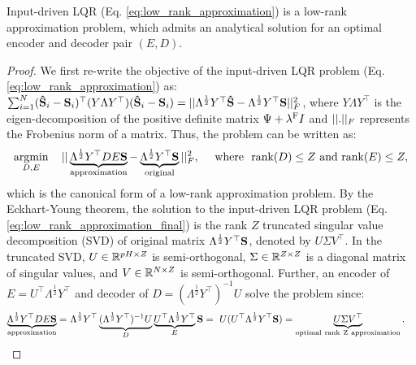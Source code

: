 \begin{prop}
    Input-driven LQR (Eq. \ref{eq:low_rank_approximation}) is a low-rank approximation problem, which admits an analytical solution for an optimal encoder and decoder pair $(E, D)$. \label{prop:input_dirven_lqr}
\end{prop}
\begin{proof}
    \renewcommand{\qedsymbol}{}
We first re-write the objective of the input-driven LQR problem (Eq. \ref{eq:low_rank_approximation}) as: 
$\sum_{i=1}^{N}(\bold{\hat{S}}_i - \bold{S}_i)^\top (Y \Lambda Y^\top) (\bold{\hat{S}}_i - \bold{S}_i)
= \vert\vert \Lambda^{\frac{1}{2}} Y^\top \bold{\hat{S}} - \Lambda^{\frac{1}{2}}Y^\top \bold{S} \vert\vert_F^2$, 
where $Y \Lambda Y^\top$ is the eigen-decomposition of the positive definite matrix $\Psi + \lambda^{\mathrm{F}} I$ and $\vert\vert . \vert\vert_F$ represents the Frobenius norm of a matrix. Thus, the problem can be written as: 
    \begin{align}
        \mathop{\rm argmin}_{D,E} \quad \vert\vert \underbrace{\Lambda^{\frac{1}{2}}Y^\top DE \bold{S}}_{\mathrm{approximation}} - \underbrace{\Lambda^{\frac{1}{2}}Y^\top \bold{S}}_{\mathrm{original}} \vert\vert_F^2, \quad{\text{~where~}} ~\text{rank}(D) \le Z \text{~and~rank}(E) \le Z, 
        \label{eq:low_rank_approximation_final}
    \end{align}
    which is the canonical form of a low-rank approximation problem. By the Eckhart-Young theorem, the solution to the input-driven LQR problem (Eq. \ref{eq:low_rank_approximation_final}) is the rank $Z$ truncated singular value decomposition (SVD) of original matrix $\Lambda^{\frac{1}{2}}Y^\top\bold{S}$, denoted by $U \Sigma V^\top$. In the truncated SVD, $U\in\mathbb{R}^{pH \times Z}$ is semi-orthogonal, $\Sigma \in \mathbb{R}^{Z\times Z}$ is a diagonal matrix of singular values, and $V \in \mathbb{R}^{N \times Z}$ is semi-orthogonal. Further, an encoder of $E = U^\top \Lambda^{\frac{1}{2}} Y^\top$ and decoder of $D = (\Lambda^{\frac{1}{2}} Y^\top)^{-1}U$ solve the problem since:
\begin{align*}
    \underbrace{\Lambda^{\frac{1}{2}}Y^\top DE \bold{S}}_{\mathrm{approximation}}
    = & ~\Lambda^{\frac{1}{2}}Y^\top \underbrace{(\Lambda^{\frac{1}{2}}Y^\top)^{-1}U}_{D} \underbrace{U^\top \Lambda^{\frac{1}{2}}Y^\top}_{E} \bold{S}
    = ~U (U^\top \Lambda^{\frac{1}{2}} Y^\top \bold{S} ) = \underbrace{U \Sigma V^\top}_{\mathrm{optimal~rank~Z~approximation}}.  
\end{align*}
\end{proof}

